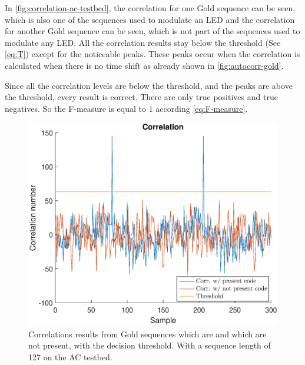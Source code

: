 In \autoref{fig:correlation-ac-testbed}, the correlation for one Gold sequence can be seen, which is also one of the sequences used to modulate an LED and the correlation for another Gold sequence can be seen, which is not part of the sequences used to modulate any LED.
All the correlation results stay below the threshold (See \autoref{eq:T}) except for the noticeable peaks.
These peaks occur when the correlation is calculated when there is no time shift as already shown in \autoref{fig:autocorr-gold}.

Since all the correlation levels are below the threshold, and the peaks are above the threshold, every result is correct.
There are only true positives and true negatives.
So the F-measure is equal to $1$ according \autoref{eq:F-measure}.

\begin{figure}[htb]
	\centering
	\includegraphics[angle=0,width=\textwidth,keepaspectratio]{chapters/evaluation-chapters/hardware/ac/correlation-ac-testbed.eps}
	\caption{Correlations results from Gold sequences which are and which are not present, with the decision threshold. With a sequence length of 127 on the AC testbed.}
	\label{fig:correlation-ac-testbed}
\end{figure}







